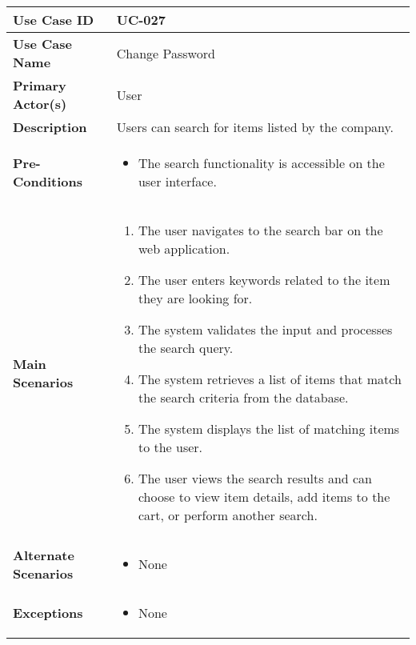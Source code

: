 \begin{table}[!ht]
    \centering
    \renewcommand{\arraystretch}{1.3} %
    \begin{tabularx}{\textwidth}{|l|X|}
        \hline
        \textbf{Use Case ID} & UC-027 \\
        \hline
        \textbf{Use Case Name} & Change Password \\
        \hline
        \textbf{Primary Actor(s)} & User \\
        \hline
        \textbf{Description} & Users can search for items listed by the company. \\
        \hline
        \textbf{Pre-Conditions} & 
        \begin{itemize}[label=--,itemsep=0pt]
            \item The search functionality is accessible on the user interface.
        \end{itemize} \\
        \hline
        \textbf{Main Scenarios} & 
        \begin{enumerate}[label=\arabic*.,itemsep=0pt]
            \item The user navigates to the search bar on the web application.
            \item The user enters keywords related to the item they are looking for.
            \item The system validates the input and processes the search query.
            \item The system retrieves a list of items that match the search criteria from the database.
            \item The system displays the list of matching items to the user.
            \item The user views the search results and can choose to view item details, add items to the cart, or perform another search.
        \end{enumerate} \\
        \hline
        \textbf{Alternate Scenarios} & 
        \begin{itemize}[label=--,itemsep=0pt]
            \item None
        \end{itemize} \\
        \hline
        \textbf{Exceptions} & 
        \begin{itemize}[label=--,itemsep=0pt]
            \item None
        \end{itemize} \\

\end{tabularx}
\end{table}
